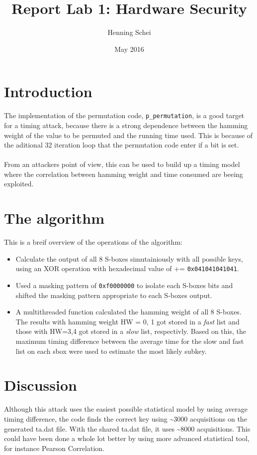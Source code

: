 \documentclass{article}
\title{Report Lab 1: Hardware Security}
\author{Henning Schei}
\date{May 2016}
\begin{document}
\maketitle

\section{Introduction}
The implementation of the permutation code, \texttt{p\_permutation}, is a good target for a timing attack, because there is a strong dependence between the hamming weight of the value to be permuted and the running time used. This is because of the aditional 32 iteration loop that the permutation code enter if a bit is set. \\ \\ From an attackers point of view, this can be used to build up a timing model where the correlation between hamming weight and time consumed are beeing exploited.       

\section{The algorithm}
 

This is a breif overview of the operations of the algorithm:
\begin{itemize}
\item Calculate the output of all 8 S-boxes simutainiously with all possible keys, using an XOR operation with hexadecimal value of += \texttt{0x041041041041}.  
\item  Used a masking pattern of \texttt{0xf0000000} to isolate each S-boxes bits and shifted the masking pattern appropriate to each S-boxes output. 
\item A multithreaded function calculated the hamming weight of all 8 S-boxes. The results with hamming weight HW = 0, 1  got stored in a \emph{fast} list and those with HW=3,4 got stored in a \emph{slow} list, respectivly.  Based on this, the maximum timing difference between the average time for the slow and fast list on each sbox were used to estimate the most likely subkey.
\end{itemize}


\section{Discussion}
Although this attack uses the easiest possible statistical model by using average timing difference, the code finds the correct key using \textasciitilde 3000 acquisitions on the generated ta.dat file. With the shared ta.dat file, it uses \textasciitilde 8000 acquisitions. This could have been done a whole lot better by using more advanced statistical tool, for instance Pearson Correlation. 
\end{document}

